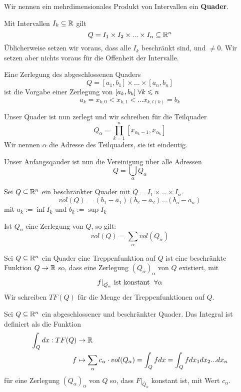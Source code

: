 \documentclass[main.tex]{subfiles}
\begin{document}
\begin{Definition}[Quader]
  Wir nennen ein mehrdimensionales Produkt von Intervallen ein \textbf{Quader}.

  Mit Intervallen $I_k \subseteq \mathbb{R}$ gilt
  $$Q = I_1 \times I_2 \times ... \times I_n \subseteq \mathbb{R}^n$$
  Üblicherweise setzen wir voraus, dass alle $I_k$ beschränkt sind, und $\neq 0$. Wir setzen aber nichts voraus für die Offenheit der Intervalle.
\end{Definition}

\begin{Definition}[Zerlegung]
  Eine Zerlegung des abgeschlossenen Quaders
  $$Q = [a_1,b_1] \times ... \times [a_n,b_n]$$
  ist die Vorgabe einer Zerlegung von $[a_k,b_k] \;\forall k \leqslant n$
  $$a_k = x_{k,0} < x_{k,1} < ... x_{k,l(k)} = b_k$$
\end{Definition}

\begin{Definition}[Adresse]
  Unser Quader ist nun zerlegt und wir schreiben für die Teilquader
  $$Q_\alpha = \prod_{k=1}^n [x_{\alpha_k - 1},x_{\alpha_k}]$$
  Wir nennen $\alpha$ die Adresse des Teilquaders, sie ist eindeutig.

  Unser Anfangsqauder ist nun die Vereinigung über alle Adressen
  $$Q = \bigcup_\alpha Q_\alpha$$
\end{Definition}

\begin{Definition}[Volumen]
  Sei $Q \subseteq \mathbb{R}^n$ ein beschränkter Quader mit $Q = I_1 \times ... \times I_n$.
  $$vol(Q) = (b_1 - a_1)(b_2 - a_2) ... (b_n - a_n)$$
  mit $a_k := \inf I_k$ und $b_k := \sup I_k$
\end{Definition}

\begin{Bemerkung}
  Ist $Q_\alpha$ eine Zerlegung von $Q$, so gilt:
  $$vol(Q) = \sum \limits_\alpha vol(Q_\alpha)$$
\end{Bemerkung}

\begin{Definition}
  Sei $Q \subseteq \mathbb{R}^n$ ein Quader eine Treppenfunktion auf $Q$ ist eine beschränkte Funktion $Q \to \mathbb{R}$ so, dass eine Zerlegung $(Q_\alpha)_\alpha$ von $Q$ existiert, mit
  $$f |_{\mathring{Q_\alpha}} \text{ ist konstant } \;\forall \alpha$$
  Wir schreiben $TF(Q)$ für die Menge der Treppenfunktionen auf $Q$.
\end{Definition}

\begin{Definition}
  Sei $Q \subseteq \mathbb{R}^n$ ein abgeschlossener und beschränkter Quader. Das Integral ist definiert als die Funktion
  $$\begin{aligned}
    \int_Q dx : TF(Q) & \to \mathbb{R} \\
    f & \mapsto \sum \limits_\alpha c_\alpha \cdot vol(Q_\alpha) = \int_Q f dx = \int_Q f dx_1 dx_2 ... dx_n
  \end{aligned}$$
  für eine Zerlegung $(Q_{\alpha})_{\alpha}$ von $Q$ so, dass $F |_{\mathring{Q_\alpha}}$ konstant ist, mit Wert $c_\alpha$.
\end{Definition}
\end{document}
